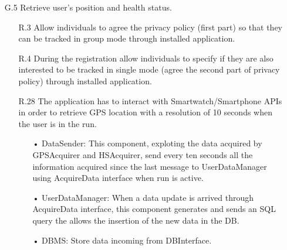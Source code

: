 \begin{enumerate}
\item [G.5] Retrieve user's position and health status.
	\begin{enumerate}
	\item [R.3] Allow individuals to agree the privacy policy (first part) so that they can be tracked in group mode through installed application.  
	\item [R.4] During the registration allow individuals to specify if they are also interested to be tracked in single mode (agree the second part of privacy policy) through installed application. 
	\item [R.28] The application has to interact with Smartwatch/Smartphone APIs in order to retrieve GPS location with a resolution of 10 seconds when the user is in the run.
		\begin{enumerate}
		\item[•] DataSender: This component, exploting the data acquired by GPSAcquirer and HSAcquirer, send every ten seconds all the information acquired since the last message to UserDataManager using AcquireData interface when run is active.
		\item[•] UserDataManager: When a data update is arrived through AcquireData interface, this component generates and sends an SQL query the allows the insertion of the new data in the DB.
		\item[•] DBMS: Store data incoming from DBInterface.
		\end{enumerate}	
	\end{enumerate}
	

\end{enumerate}
